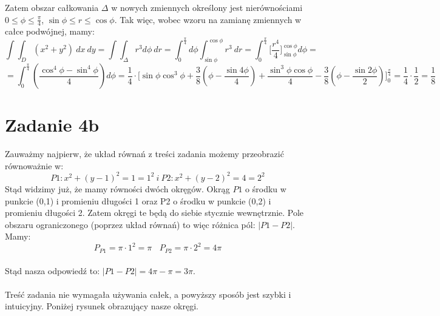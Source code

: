 \documentclass{article}
\begin{document}
\hfill \break

Zatem obszar całkowania $\Delta$ w nowych zmiennych określony jest nierównościami $0 \leq \phi \leq \frac{\pi}{4}$, $\sin{\phi} \leq r \leq \cos{\phi}$. Tak więc, wobec wzoru na zamianę zmiennych w całce podwójnej, mamy:
$$\int \int_{D} (x^2+y^2) \ dx \ dy = \int \int_{\Delta} r^3 d\phi \ dr = \int_{0}^{\frac{\pi}{4}} d\phi \int_{\sin{\phi}}^{\cos{\phi}} r^3 \ dr = \int_{0}^{\frac{\pi}{4}} \Big[\frac{r^4}{4}\Big]^{\cos{\phi}}_{\sin{\phi}} d\phi = $$
$$= \int_{0}^{\frac{\pi}{4}} (\frac{\cos^4{\phi}-\sin^4{\phi}}{4}) d\phi = \frac{1}{4} \cdot \Big[\sin{\phi}\cos^3{\phi} + \frac{3}{8}(\phi - \frac{\sin{4\phi}}{4}) + \frac{\sin^3{\phi}\cos{\phi}}{4} - \frac{3}{8}(\phi - \frac{\sin{2\phi}}{2}) \Big]^{\frac{\pi}{4}}_{0} = \frac{1}{4} \cdot \frac{1}{2} = \frac{1}{8}$$

\section*{Zadanie 4b}

Zauważmy najpierw, że układ równań z treści zadania możemy przeobrazić równoważnie w:
$$P1: x^2 + (y-1)^2 = 1 = 1^2 \ i \ P2: x^2 + (y-2)^2 = 4 = 2^2$$
Stąd widzimy już, że mamy równości dwóch okręgów. Okrąg $P1$ o środku w punkcie (0,1) i promieniu długości 1 oraz P2 o środku w punkcie (0,2) i promieniu długości 2. Zatem okręgi te będą do siebie stycznie wewnętrznie. Pole obszaru ograniczonego (poprzez układ równań) to więc różnica pól: $|P1 - P2|$. Mamy:
$$P_{P1} = \pi \cdot 1^2 = \pi \ \ \ \ P_{P2} = \pi \cdot 2^2 = 4 \pi$$ \\
Stąd nasza odpowiedź to: $|P1 - P2| = 4\pi - \pi = 3 \pi$. \\ \\
Treść zadania nie wymagała używania całek, a powyższy sposób jest szybki i intuicyjny. Poniżej rysunek obrazujący nasze okręgi. \\

\end{document}

